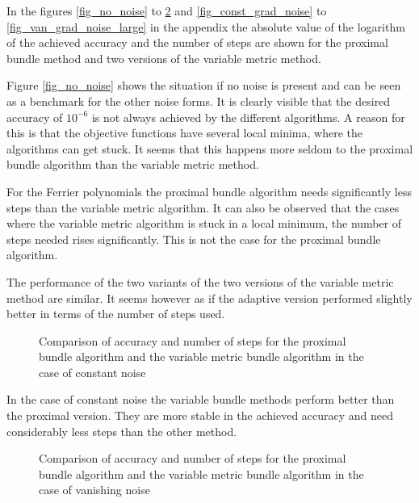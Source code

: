 In the figures \ref{fig_no_noise} to \ref{fig_van_noise} and \ref{fig_const_grad_noise} to \ref{fig_van_grad_noise_large} in the appendix the absolute value of the logarithm of the achieved accuracy and the number of steps are shown for the proximal bundle method and two versions of the variable metric method.

Figure \ref{fig_no_noise} shows the situation if no noise is present and can be seen as a benchmark for the other noise forms.
It is clearly visible that the desired accuracy of \(10^{-6}\) is not always achieved by the different algorithms. A reason for this is that the objective functions have several local minima, where the algorithms can get stuck. It seems that this happens more seldom to the proximal bundle algorithm than the variable metric method.

For the Ferrier polynomials the proximal bundle algorithm needs significantly less steps than the variable metric algorithm. It can also be observed that the cases where the variable metric algorithm is stuck in a local minimum, the number of steps needed rises significantly. This is not the case for the proximal bundle algorithm.

The performance of the two variants of the two versions of the variable metric method are similar. It seems however as if the adaptive version performed slightly better in terms of the number of steps used.


\begin{figure}[ht]
	\begin{subfigure}{0.49\textwidth}
	\end{subfigure}
	\begin{subfigure}{0.49\textwidth}
	\end{subfigure}
	\caption{Comparison of accuracy and number of steps for the proximal bundle algorithm and the variable metric bundle algorithm in the case of constant noise}%
	\label{fig_const_noise}%
\end{figure}

In the case of constant noise the variable bundle methods perform better than the proximal version. They are more stable in the achieved accuracy and need considerably less steps than the other method.

\begin{figure}[ht]
	\begin{subfigure}{0.49\textwidth}
	\end{subfigure}
	\begin{subfigure}{0.49\textwidth}
	\end{subfigure}
	\caption{Comparison of accuracy and number of steps for the proximal bundle algorithm and the variable metric bundle algorithm in the case of vanishing noise}%
	\label{fig_van_noise}%
\end{figure}

